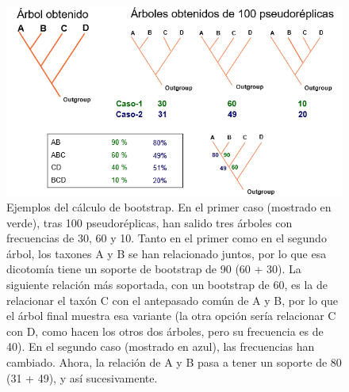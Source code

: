 \begin{figure}[htbp]
\centering
\includegraphics[width=0.7\linewidth]{figs/ejemplos-bootstrap.png}
\caption{Ejemplos del cálculo de bootstrap. En el primer caso (mostrado en verde), tras 100 pseudoréplicas, han salido tres árboles con frecuencias de 30, 60 y 10. Tanto en el primer como en el segundo árbol, los taxones A y B se han relacionado juntos, por lo que esa dicotomía tiene un soporte de bootstrap de 90 (60 + 30). La siguiente relación más soportada, con un bootstrap de 60, es la de relacionar el taxón C con el antepasado común de A y B, por lo que el árbol final muestra esa variante (la otra opción sería relacionar C con D, como hacen los otros dos árboles, pero su frecuencia es de 40). En el segundo caso (mostrado en azul), las frecuencias han cambiado. Ahora, la relación de A y B pasa a tener un soporte de 80 (31 + 49), y así sucesivamente.}
\end{figure}
